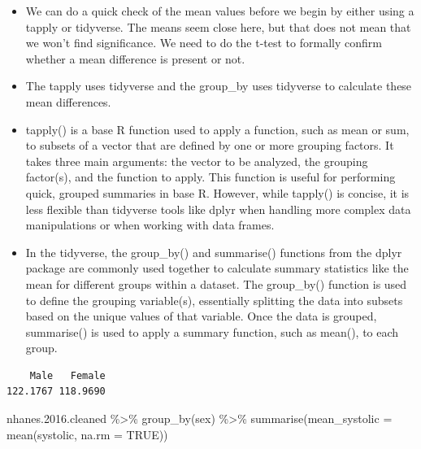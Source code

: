 \documentclass[
  letterpaper,
  DIV=11,
  numbers=noendperiod]{scrreprt}
\newenvironment{Shaded}{\begin{snugshade}}{\end{snugshade}}
\newcommand{\AttributeTok}[1]{\textcolor[rgb]{0.40,0.45,0.13}{#1}}
\newcommand{\ConstantTok}[1]{\textcolor[rgb]{0.56,0.35,0.01}{#1}}
\newcommand{\FloatTok}[1]{\textcolor[rgb]{0.68,0.00,0.00}{#1}}
\newcommand{\FunctionTok}[1]{\textcolor[rgb]{0.28,0.35,0.67}{#1}}
\newcommand{\NormalTok}[1]{\textcolor[rgb]{0.00,0.23,0.31}{#1}}
\newcommand{\SpecialCharTok}[1]{\textcolor[rgb]{0.37,0.37,0.37}{#1}}
\providecommand{\tightlist}{%
  \setlength{\itemsep}{0pt}\setlength{\parskip}{0pt}}\usepackage{longtable,booktabs,array}
\begin{document}
\begin{itemize}
\tightlist
\item
  We can do a quick check of the mean values before we begin by either
  using a tapply or tidyverse. The means seem close here, but that does
  not mean that we won't find significance. We need to do the t-test to
  formally confirm whether a mean difference is present or not.
\item
  The tapply uses tidyverse and the group\_by uses tidyverse to
  calculate these mean differences.
\item
  tapply() is a base R function used to apply a function, such as mean
  or sum, to subsets of a vector that are defined by one or more
  grouping factors. It takes three main arguments: the vector to be
  analyzed, the grouping factor(s), and the function to apply. This
  function is useful for performing quick, grouped summaries in base R.
  However, while tapply() is concise, it is less flexible than tidyverse
  tools like dplyr when handling more complex data manipulations or when
  working with data frames.
\item
  In the tidyverse, the group\_by() and summarise() functions from the
  dplyr package are commonly used together to calculate summary
  statistics like the mean for different groups within a dataset. The
  group\_by() function is used to define the grouping variable(s),
  essentially splitting the data into subsets based on the unique values
  of that variable. Once the data is grouped, summarise() is used to
  apply a summary function, such as mean(), to each group.
\end{itemize}

\begin{Shaded}
\end{Shaded}

\begin{verbatim}
    Male   Female 
122.1767 118.9690 
\end{verbatim}

\begin{Shaded}
\begin{Highlighting}[]
\NormalTok{nhanes.}\FloatTok{2016.}\NormalTok{cleaned }\SpecialCharTok{\%\textgreater{}\%}
    \FunctionTok{group\_by}\NormalTok{(sex) }\SpecialCharTok{\%\textgreater{}\%}
    \FunctionTok{summarise}\NormalTok{(}\AttributeTok{mean\_systolic =} \FunctionTok{mean}\NormalTok{(systolic, }\AttributeTok{na.rm =} \ConstantTok{TRUE}\NormalTok{))}
\end{Highlighting}
\end{Shaded}
\end{document}
